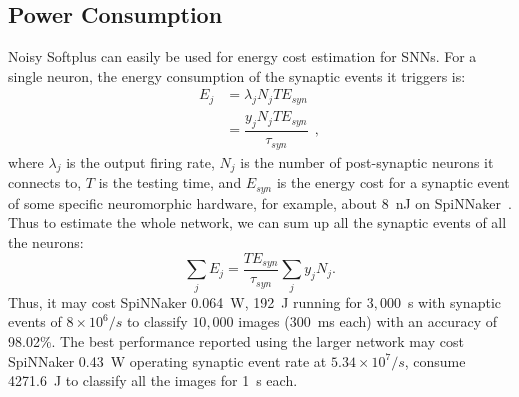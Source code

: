 \documentclass[runningheads,a4paper]{llncs}
\begin{document}
\subsection{Power Consumption}
Noisy Softplus can easily be used for energy cost estimation for SNNs.
For a single neuron, the energy consumption of the synaptic events it triggers is:
\begin{equation}
\begin{aligned}
E_{j} &= \lambda_j N_j T E_{syn}\\
&= \dfrac{y_j N_j T E_{syn}}{\tau_{syn}}~~,
\end{aligned}
\label{equ:energy}
\end{equation}
where $\lambda_j$ is the output firing rate, $N_j$ is the number of post-synaptic neurons it connects to, $T$ is the testing time, and $E_{syn}$ is the energy cost for a synaptic event of some specific neuromorphic hardware, for example, about 8~nJ on SpiNNaker~\cite{stromatias2013power}.
Thus to estimate the whole network, we can sum up all the synaptic events of all the neurons:
\begin{equation}
\sum_j E_{j} =  \dfrac{T E_{syn}}{\tau_{syn}} \sum_{j}y_j N_j.
\end{equation}
Thus, it may cost SpiNNaker 0.064~W, 192~J running for $3,000$~s with synaptic events of $8\times10^6/s$ to classify $10,000$ images (300~ms each) with an accuracy of 98.02\%.
The best performance reported using the larger network may cost SpiNNaker 0.43~W operating synaptic event rate at $5.34\times10^7/s$, consume 4271.6~J to classify all the images for 1~s each.
\end{document}
